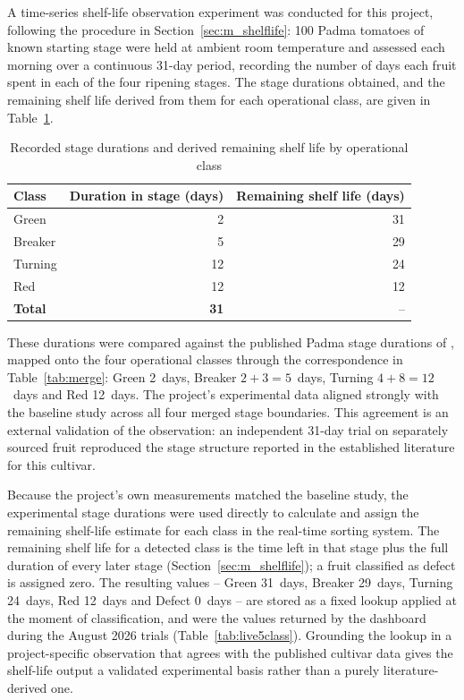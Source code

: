 A time-series shelf-life observation experiment was conducted for this project, following the procedure in Section~\ref{sec:m_shelflife}: 100 Padma tomatoes of known starting stage were held at ambient room temperature and assessed each morning over a continuous 31-day period, recording the number of days each fruit spent in each of the four ripening stages. The stage durations obtained, and the remaining shelf life derived from them for each operational class, are given in Table~\ref{tab:shelfresults}.

\begin{table}[H]
\caption{Recorded stage durations and derived remaining shelf life by operational class}
\label{tab:shelfresults}
\centering
\begin{tabular}{lrr}
\toprule
\textbf{Class} & \textbf{Duration in stage (days)} & \textbf{Remaining shelf life (days)} \\
\midrule
Green   & 2  & 31 \\
Breaker & 5  & 29 \\
Turning & 12 & 24 \\
Red     & 12 & 12 \\
\midrule
\textbf{Total} & \textbf{31} & -- \\
\bottomrule
\end{tabular}
\end{table}

These durations were compared against the published Padma stage durations of \citet{abekoon2024}, mapped onto the four operational classes through the correspondence in Table~\ref{tab:merge}: Green 2~days, Breaker $2+3=5$~days, Turning $4+8=12$~days and Red 12~days. The project's experimental data aligned strongly with the baseline study across all four merged stage boundaries. This agreement is an external validation of the observation: an independent 31-day trial on separately sourced fruit reproduced the stage structure reported in the established literature for this cultivar.

Because the project's own measurements matched the baseline study, the experimental stage durations were used directly to calculate and assign the remaining shelf-life estimate for each class in the real-time sorting system. The remaining shelf life for a detected class is the time left in that stage plus the full duration of every later stage (Section~\ref{sec:m_shelflife}); a fruit classified as defect is assigned zero. The resulting values -- Green 31~days, Breaker 29~days, Turning 24~days, Red 12~days and Defect 0~days -- are stored as a fixed lookup applied at the moment of classification, and were the values returned by the dashboard during the August 2026 trials (Table~\ref{tab:live5class}). Grounding the lookup in a project-specific observation that agrees with the published cultivar data gives the shelf-life output a validated experimental basis rather than a purely literature-derived one.

